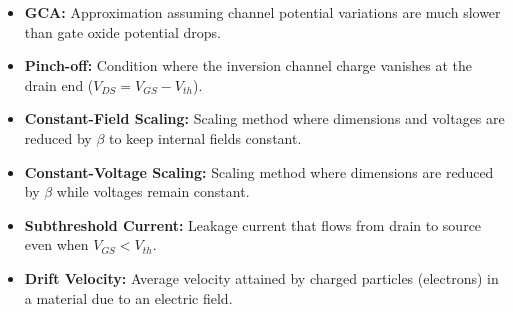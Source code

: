 \documentclass[12pt,a4paper]{article}
\begin{document}
\begin{tcolorbox}[defbox, title={\textbf{One-Line Definitions}}]
\begin{itemize}[leftmargin=*, itemsep=2.5pt, topsep=0pt]
  \item \textbf{GCA:} Approximation assuming channel potential variations are much slower than gate oxide potential drops.
  \item \textbf{Pinch-off:} Condition where the inversion channel charge vanishes at the drain end ($V_{DS} = V_{GS} - V_{th}$).
  \item \textbf{Constant-Field Scaling:} Scaling method where dimensions and voltages are reduced by $\beta$ to keep internal fields constant.
  \item \textbf{Constant-Voltage Scaling:} Scaling method where dimensions are reduced by $\beta$ while voltages remain constant.
  \item \textbf{Subthreshold Current:} Leakage current that flows from drain to source even when $V_{GS} < V_{th}$.
  \item \textbf{Drift Velocity:} Average velocity attained by charged particles (electrons) in a material due to an electric field.
\end{itemize}
\end{tcolorbox}
\end{document}
